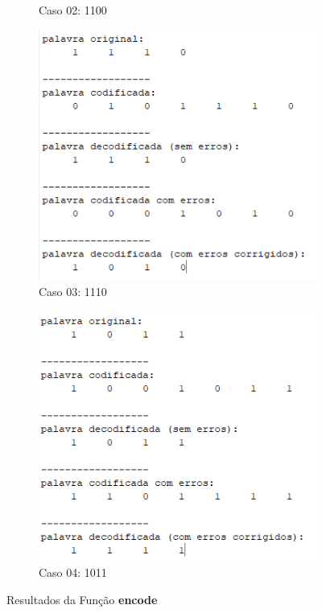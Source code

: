 \documentclass{article}
\begin{document}
\begin{figure}[htbp]
\begin{subfigure}[b]{0.22\textwidth}
        \caption{Caso 02: 1100}
        \label{fig:imagem2}
    \end{subfigure}
    \hfill
    \begin{subfigure}[b]{0.22\textwidth}
        \includegraphics[width=\textwidth]{4bitsCaso03.png}
        \caption{Caso 03: 1110}
        \label{fig:imagem3}
    \end{subfigure}
    \hfill
    \begin{subfigure}[b]{0.22\textwidth}
        \includegraphics[width=\textwidth]{4bitsCaso04.png}
        \caption{Caso 04: 1011}
        \label{fig:imagem4}
    \end{subfigure}
    
    \caption{Resultados da Função \textbf{encode}}
    \label{fig:conjunto-imagens}
\end{figure}
\end{document}
